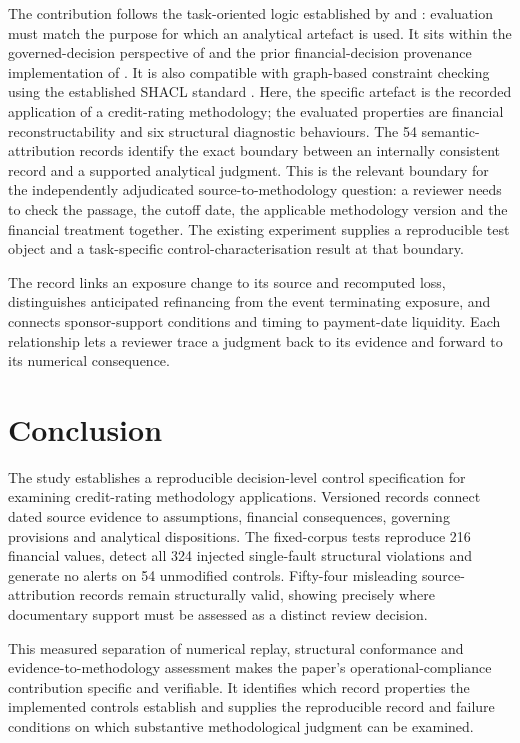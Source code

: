 \documentclass[11pt,a4paper]{article}
\begin{document}
The contribution follows the task-oriented logic established by \citet{bucker2022} and \citet{xie2026}: evaluation must match the purpose for which an analytical artefact is used. It sits within the governed-decision perspective of \citet{khalili2026} and the prior financial-decision provenance implementation of \citet{huynh2021}. It is also compatible with graph-based constraint checking using the established SHACL standard \citep{shacl2017}. Here, the specific artefact is the recorded application of a credit-rating methodology; the evaluated properties are financial reconstructability and six structural diagnostic behaviours. The 54 semantic-attribution records identify the exact boundary between an internally consistent record and a supported analytical judgment. This is the relevant boundary for the independently adjudicated source-to-methodology question: a reviewer needs to check the passage, the cutoff date, the applicable methodology version and the financial treatment together. The existing experiment supplies a reproducible test object and a task-specific control-characterisation result at that boundary.

The record links an exposure change to its source and recomputed loss, distinguishes anticipated refinancing from the event terminating exposure, and connects sponsor-support conditions and timing to payment-date liquidity. Each relationship lets a reviewer trace a judgment back to its evidence and forward to its numerical consequence.

\section{Conclusion}

The study establishes a reproducible decision-level control specification for examining credit-rating methodology applications. Versioned records connect dated source evidence to assumptions, financial consequences, governing provisions and analytical dispositions. The fixed-corpus tests reproduce 216 financial values, detect all 324 injected single-fault structural violations and generate no alerts on 54 unmodified controls. Fifty-four misleading source-attribution records remain structurally valid, showing precisely where documentary support must be assessed as a distinct review decision.

This measured separation of numerical replay, structural conformance and evidence-to-methodology assessment makes the paper's operational-compliance contribution specific and verifiable. It identifies which record properties the implemented controls establish and supplies the reproducible record and failure conditions on which substantive methodological judgment can be examined.
\end{document}
